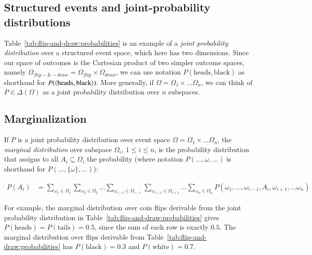 \documentclass[nobib,nofonts]{tufte-handout}
\renewcommand{\markdef}[1]{\emph{#1}}
\begin{document}
\subsection{Structured events and joint-probability distributions}

Table~\ref{tab:flip-and-draw:probabilities} is an example of a \markdef{joint
  probability distribution} over a structured event space, which here has two dimensions. Since
our space of outcomes is the Cartesian product of two simpler outcome spaces, namely
$\Omega_{flip-\&-draw} = \Omega_{flip} \times \Omega_{draw}$, we can use notation
$P(\text{heads}, \text{black})$ as shorthand for $P(\left \langle \text{heads}, \text{black}\right\rangle)$. More
generally, if $\Omega = \Omega_1 \times \dots \Omega_n$, we can think of $P \in \Delta(\Omega)$
as a joint probability distribution over $n$ subspaces.

\subsection{Marginalization}

If $P$ is a joint probability distribution over event space $\Omega = \Omega_1 \times \dots \Omega_n$, the \emph{marginal distribution} over subspace  $\Omega_i$, $1 \le i \le n$, is the probability distribution that assigns to all $A_i \subseteq \Omega_i$ the probability (where notation $P(\dots, \omega, \dots )$ is shorthand for $P(\dots, \{\omega \}, \dots)$):

\begin{align*}
P(A_i) & = \sum_{\omega_1 \in \Omega_{1}} \sum_{\omega_2 \in \Omega_{2}} \dots  \sum_{\omega_{i-1} \in \Omega_{i-1}} \sum_{\omega_{i+1} \in \Omega_{i+1}} \dots \sum_{\omega_n \in \Omega_n} P(\omega_1, \dots, \omega_{i-1}, A_{i}, \omega_{i+1}, \dots \omega_n)
\end{align*}

For example, the marginal distribution over coin flips derivable from the joint probability
distribution in Table~\ref{tab:flip-and-draw:probabilities} gives $P(\text{heads}) = P(\text{tails}) =
0.5$, since the sum of each row is exactly $0.5$. The marginal distribution over flips
derivable from Table~\ref{tab:flip-and-draw:probabilities} has $P(\text{black}) = 0.3$ and
$P(\text{white}) = 0.7$.
\end{document}
